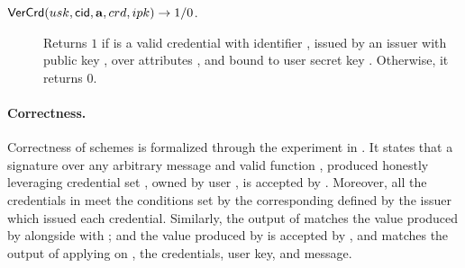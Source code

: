 \begin{description}
\item[$\mathsf{VerCrd}(usk,\mathsf{cid},\mathbf{a},crd,ipk) \rightarrow 1/0$.] Returns
  $1$ if \cred is a valid credential with identifier \cid, issued by an issuer
  with public key \ipk, over attributes \attrs, and bound to user secret key
  \usk. Otherwise, it returns $0$.
\end{description}


\paragraph{Correctness.} %
Correctness of \UAS schemes is formalized through the experiment in
. It states that a signature over any arbitrary message
and valid function \feval, produced honestly leveraging credential set \scid,
owned by user \uid, is accepted by \Verify. Moreover, all the credentials in
\scid meet the conditions set by the corresponding \fissue defined by the issuer
which issued each credential. Similarly, the output of \feval matches the
value produced by \Sign alongside with \sig; and the value produced by \Open
is accepted by \Judge, and matches the output of applying \finsp on \Yeval, the
credentials, user key, and message.

